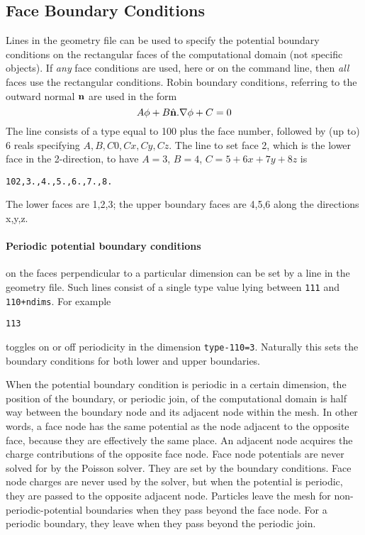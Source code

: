 \documentclass[12pt]{article}
\begin{document}
\subsection{Face Boundary Conditions}

Lines in the geometry file can be used to specify the potential
boundary conditions on the rectangular faces of the computational
domain (not specific objects). If \emph{any} face conditions are used,
here or on the command line, then \emph{all} faces use the rectangular
conditions.  Robin boundary conditions, referring to the outward
normal ${\bf n}$ are used in the form
$$A\phi + B \hat{\bf n}.\nabla\phi + C =0$$
The line consists of a type equal to 100 plus the face number,
followed by (up to) 6 reals specifying $A,B,C0,Cx,Cy,Cz$.
The line to set face 2, which is the lower face in the 2-direction, to
have $A=3$, $B=4$, $C=5+6x+7y+8z$ is
\begin{verbatim}
102,3.,4.,5.,6.,7.,8.
\end{verbatim}
The lower faces are 1,2,3; the upper boundary faces are 4,5,6 along
the directions x,y,z.

\paragraph{Periodic potential boundary conditions}
on the faces perpendicular to a particular dimension can be set by a
line in the geometry file. Such lines consist of a single type value lying
between \verb!111! and \verb!110+ndims!. For example
\begin{verbatim}
113
\end{verbatim}
toggles on or off periodicity in the dimension
\verb!type-110=3!. Naturally this sets the boundary conditions for
both lower and upper boundaries. 

When the potential boundary condition is periodic in a certain
dimension, the position of the boundary, or periodic join, of the
computational domain is half way between the boundary node and its
adjacent node within the mesh. In other words, a face node has the
same potential as the node adjacent to the opposite face, because they
are effectively the same place. An adjacent node acquires the charge
contributions of the opposite face node. Face node potentials are
never solved for by the Poisson solver. They are set by the boundary
conditions. Face node charges are never used by the solver, but when
the potential is periodic, they are passed to the opposite adjacent
node. Particles leave the mesh for non-periodic-potential boundaries
when they pass beyond the face node. For a periodic boundary, they
leave when they pass beyond the periodic join.
\end{document}
